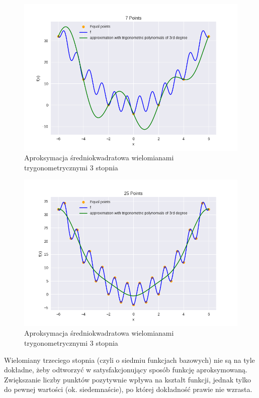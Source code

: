 \documentclass{article}
\begin{document}
\begin{figure}[H]
    \centering
    \includegraphics[width=\textwidth]{img/tripoly_3_7.png}
    \caption{Aproksymacja średniokwadratowa wielomianami trygonometrycznymi 3 stopnia}
\end{figure}

\begin{figure}[H]
    \centering
    \includegraphics[width=\textwidth]{img/tripoly_3_25.png}
    \caption{Aproksymacja średniokwadratowa wielomianami trygonometrycznymi 3 stopnia}
\end{figure}

Wielomiany trzeciego stopnia (czyli o siedmiu funkcjach bazowych) nie są na tyle dokładne, żeby odtworzyć w satysfakcjonujący
sposób funkcję aproksymowaną. Zwiększanie liczby punktów pozytywnie wpływa na kształt funkcji, jednak tylko do pewnej wartości
(ok. siedemnaście), po której dokładność prawie nie wzrasta.
\end{document}
